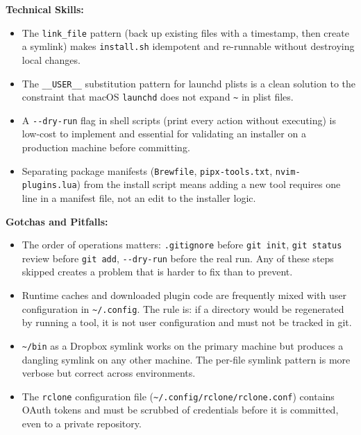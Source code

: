 \documentclass[
  11pt,
  letterpaper,
  DIV=11,
  numbers=noendperiod]{scrartcl}
\providecommand{\tightlist}{%
  \setlength{\itemsep}{0pt}\setlength{\parskip}{0pt}}
\begin{document}
\textbf{Technical Skills:}

\begin{itemize}
\tightlist
\item
  The \texttt{link\_file} pattern (back up existing files with a
  timestamp, then create a symlink) makes \texttt{install.sh} idempotent
  and re-runnable without destroying local changes.
\item
  The \texttt{\_\_USER\_\_} substitution pattern for launchd plists is a
  clean solution to the constraint that macOS \texttt{launchd} does not
  expand \texttt{\textasciitilde{}} in plist files.
\item
  A \texttt{-\/-dry-run} flag in shell scripts (print every action
  without executing) is low-cost to implement and essential for
  validating an installer on a production machine before committing.
\item
  Separating package manifests (\texttt{Brewfile},
  \texttt{pipx-tools.txt}, \texttt{nvim-plugins.lua}) from the install
  script means adding a new tool requires one line in a manifest file,
  not an edit to the installer logic.
\end{itemize}

\textbf{Gotchas and Pitfalls:}

\begin{itemize}
\tightlist
\item
  The order of operations matters: \texttt{.gitignore} before
  \texttt{git\ init}, \texttt{git\ status} review before
  \texttt{git\ add}, \texttt{-\/-dry-run} before the real run. Any of
  these steps skipped creates a problem that is harder to fix than to
  prevent.
\item
  Runtime caches and downloaded plugin code are frequently mixed with
  user configuration in \texttt{\textasciitilde{}/.config}. The rule is:
  if a directory would be regenerated by running a tool, it is not user
  configuration and must not be tracked in git.
\item
  \texttt{\textasciitilde{}/bin} as a Dropbox symlink works on the
  primary machine but produces a dangling symlink on any other machine.
  The per-file symlink pattern is more verbose but correct across
  environments.
\item
  The \texttt{rclone} configuration file
  (\texttt{\textasciitilde{}/.config/rclone/rclone.conf}) contains OAuth
  tokens and must be scrubbed of credentials before it is committed,
  even to a private repository.
\end{itemize}
\end{document}

